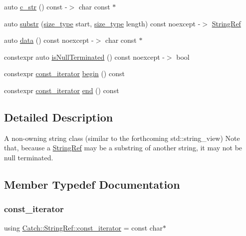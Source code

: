 \begin{DoxyCompactItemize}
auto \mbox{\hyperlink{class_catch_1_1_string_ref_a1669cb2765e820ca258159676cbd82a5}{c\+\_\+str}} () const -\/$>$ char const $\ast$
\item 
auto \mbox{\hyperlink{class_catch_1_1_string_ref_a594bc3e10ffad77df92f7d1a4c99d7ff}{substr}} (\mbox{\hyperlink{class_catch_1_1_string_ref_a06b4db8fc82b197004291cf370b2ba7c}{size\+\_\+type}} start, \mbox{\hyperlink{class_catch_1_1_string_ref_a06b4db8fc82b197004291cf370b2ba7c}{size\+\_\+type}} length) const noexcept -\/$>$ \mbox{\hyperlink{class_catch_1_1_string_ref}{String\+Ref}}
\item 
auto \mbox{\hyperlink{class_catch_1_1_string_ref_ab0f85edde9f97153fc758fac3bb14507}{data}} () const noexcept -\/$>$ char const $\ast$
\item 
constexpr auto \mbox{\hyperlink{class_catch_1_1_string_ref_a646e58f5f4e1f5e82cfba06d9fd5d016}{is\+Null\+Terminated}} () const noexcept -\/$>$ bool
\item 
constexpr \mbox{\hyperlink{class_catch_1_1_string_ref_ac3aa3d16f48b5429a480f823c504f93c}{const\+\_\+iterator}} \mbox{\hyperlink{class_catch_1_1_string_ref_ab0adc7198d60867c2842b998ae456795}{begin}} () const
\item 
constexpr \mbox{\hyperlink{class_catch_1_1_string_ref_ac3aa3d16f48b5429a480f823c504f93c}{const\+\_\+iterator}} \mbox{\hyperlink{class_catch_1_1_string_ref_a3ce9afc711b559d6cc59666898fc0828}{end}} () const
\end{DoxyCompactItemize}


\subsection{Detailed Description}
A non-\/owning string class (similar to the forthcoming std\+::string\+\_\+view) Note that, because a \mbox{\hyperlink{class_catch_1_1_string_ref}{String\+Ref}} may be a substring of another string, it may not be null terminated. 

\subsection{Member Typedef Documentation}
\mbox{\label{class_catch_1_1_string_ref_ac3aa3d16f48b5429a480f823c504f93c}} 
\subsubsection{\texorpdfstring{const\+\_\+iterator}{const\_iterator}}
{\footnotesize\ttfamily using \mbox{\hyperlink{class_catch_1_1_string_ref_ac3aa3d16f48b5429a480f823c504f93c}{Catch\+::\+String\+Ref\+::const\+\_\+iterator}} =  const char$\ast$}

